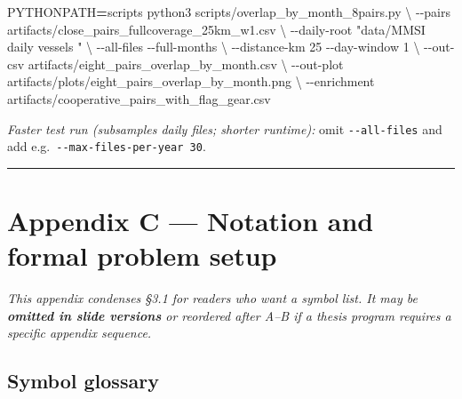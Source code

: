 \documentclass[
]{article}
\newenvironment{Shaded}{\begin{snugshade}}{\end{snugshade}}
\newcommand{\AttributeTok}[1]{\textcolor[rgb]{0.13,0.29,0.53}{#1}}
\newcommand{\DataTypeTok}[1]{\textcolor[rgb]{0.13,0.29,0.53}{#1}}
\newcommand{\ExtensionTok}[1]{#1}
\newcommand{\NormalTok}[1]{#1}
\newcommand{\OperatorTok}[1]{\textcolor[rgb]{0.81,0.36,0.00}{\textbf{#1}}}
\newcommand{\StringTok}[1]{\textcolor[rgb]{0.31,0.60,0.02}{#1}}
\newcommand{\VariableTok}[1]{\textcolor[rgb]{0.00,0.00,0.00}{#1}}
\begin{document}
\begin{Shaded}
\begin{Highlighting}[]
\VariableTok{PYTHONPATH}\OperatorTok{=}\NormalTok{scripts }\ExtensionTok{python3}\NormalTok{ scripts/overlap\_by\_month\_8pairs.py }\DataTypeTok{\textbackslash{}}
  \AttributeTok{{-}{-}pairs}\NormalTok{ artifacts/close\_pairs\_fullcoverage\_25km\_w1.csv }\DataTypeTok{\textbackslash{}}
  \AttributeTok{{-}{-}daily{-}root} \StringTok{"data/MMSI daily vessels "} \DataTypeTok{\textbackslash{}}
  \AttributeTok{{-}{-}all{-}files} \AttributeTok{{-}{-}full{-}months} \DataTypeTok{\textbackslash{}}
  \AttributeTok{{-}{-}distance{-}km}\NormalTok{ 25 }\AttributeTok{{-}{-}day{-}window}\NormalTok{ 1 }\DataTypeTok{\textbackslash{}}
  \AttributeTok{{-}{-}out{-}csv}\NormalTok{ artifacts/eight\_pairs\_overlap\_by\_month.csv }\DataTypeTok{\textbackslash{}}
  \AttributeTok{{-}{-}out{-}plot}\NormalTok{ artifacts/plots/eight\_pairs\_overlap\_by\_month.png }\DataTypeTok{\textbackslash{}}
  \AttributeTok{{-}{-}enrichment}\NormalTok{ artifacts/cooperative\_pairs\_with\_flag\_gear.csv}
\end{Highlighting}
\end{Shaded}

\emph{Faster test run (subsamples daily files; shorter runtime):} omit
\texttt{-\/-all-files} and add e.g.~\texttt{-\/-max-files-per-year\ 30}.

\begin{center}\rule{0.5\linewidth}{0.5pt}\end{center}

\clearpage

\section*{Appendix C --- Notation and formal problem
setup}\label{appendix-c-notation-and-formal-problem-setup}

\emph{This appendix condenses §3.1 for readers who want a symbol list.
It may be \textbf{omitted in slide versions} or reordered after A--B if
a thesis program requires a specific appendix sequence.}

\subsection*{Symbol glossary}\label{symbol-glossary}
\end{document}
